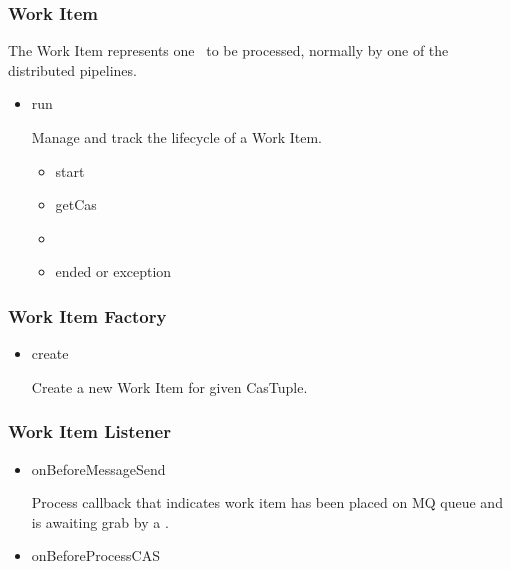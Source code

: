 \begin{itemize}
    \subsubsection{Work Item}
    
    The Work Item represents one \varCAS~to be processed, normally by one of the
    distributed \varUIMA pipelines.
    
    \begin{itemize}
    
      \item run
      
      Manage and track the lifecycle of a Work Item.
      
      \begin{itemize}
        \item start
        \item getCas
        \item \varSendAndReceiveCAS
        \item ended or exception
      \end{itemize}    
      
    \end{itemize}    
     
    \subsubsection{Work Item Factory}
    
    \begin{itemize}
    
      \item create
      
      Create a new Work Item for given CasTuple.
      
    \end{itemize}  
          
    \subsubsection{Work Item Listener}
    
    \begin{itemize}
    
      \item onBeforeMessageSend
      
      Process callback that indicates work item has been placed on MQ queue and
      is awaiting grab by a \varJP.
      
      \item onBeforeProcessCAS
            

\end{itemize}
\end{itemize}

